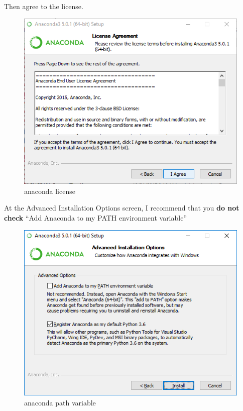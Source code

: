 \documentclass{book}
\makeatletter
\def\maxwidth{\ifdim\Gin@nat@width>\linewidth\linewidth
    \else\Gin@nat@width\fi}
\let\Oldincludegraphics\includegraphics
\renewcommand{\includegraphics}[1]{\Oldincludegraphics[width=.8\maxwidth]{#1}}
\makeatother
\begin{document}
Then agree to the license.

\begin{figure}
\centering
\includegraphics{images/anaconda_agree_to_license.png}
\caption{anaconda license}
\end{figure}

At the Advanced Installation Options screen, I recommend that you
\textbf{do not check} ``Add Anaconda to my PATH environment variable''

\begin{figure}
\centering
\includegraphics{images/anaconda_path2.png}
\caption{anaconda path variable}
\end{figure}
    
\end{document}
